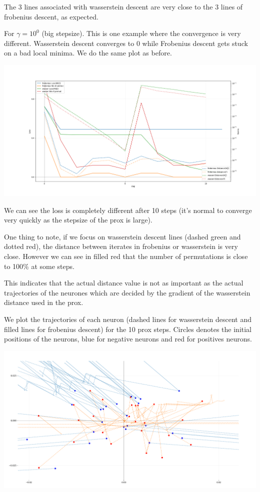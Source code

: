 The 3 lines associated with wasserstein descent are very close to the 3 lines of frobenius descent, as expected.

For $\gamma = 10^0$ (big stepsize). This is one example where the convergence is very different. Wasserstein descent converges to 0 while Frobenius descent gets stuck on a bad local minima. We do the same plot as before.

\includegraphics[width=1.0\textwidth]{imgs/grand_pas_10steps.png}

We can see the loss is completely different after 10 steps (it's normal to converge very quickly as the stepsize of the prox is large).

One thing to note, if we focus on wasserstein descent lines (dashed green and dotted red), the distance between iterates in frobenius or wasserstein is very close. However we can see in filled red that the number of permutations is close to 100\% at some steps.

This indicates that the actual distance value is not as important as the actual trajectories of the neurones which are decided by the gradient of the wasserstein distance used in the prox.

We plot the trajectories of each neuron (dashed lines for wasserstein descent and filled lines for frobenius descent) for the 10 prox steps. Circles denotes the initial positions of the neurons, blue for negative neurons and red for positives neurons.

\includegraphics[width=1.0\textwidth]{imgs/grand_pas_10steps_trajs.png}

